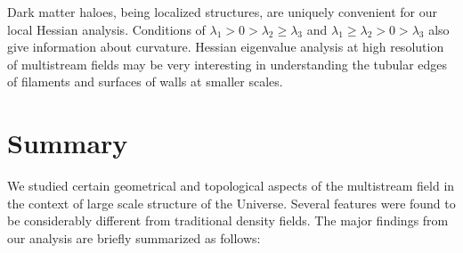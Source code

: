 Dark matter haloes, being localized structures, are uniquely convenient for our local Hessian analysis. Conditions of $\lambda_1 > 0 > \lambda_2 \geq \lambda_3 $ and $\lambda_1 \geq \lambda_2 > 0 > \lambda_3 $ also give information about curvature. Hessian eigenvalue analysis at high resolution of multistream fields may be very interesting in understanding the tubular edges of filaments and surfaces of walls at smaller scales. 

\section{Summary}
\label{sec:4summary}

We studied certain geometrical and topological aspects of the multistream field in the context of large scale structure of the Universe. Several features were found to be considerably different from traditional density fields. The major findings from our analysis are briefly summarized as follows: 

